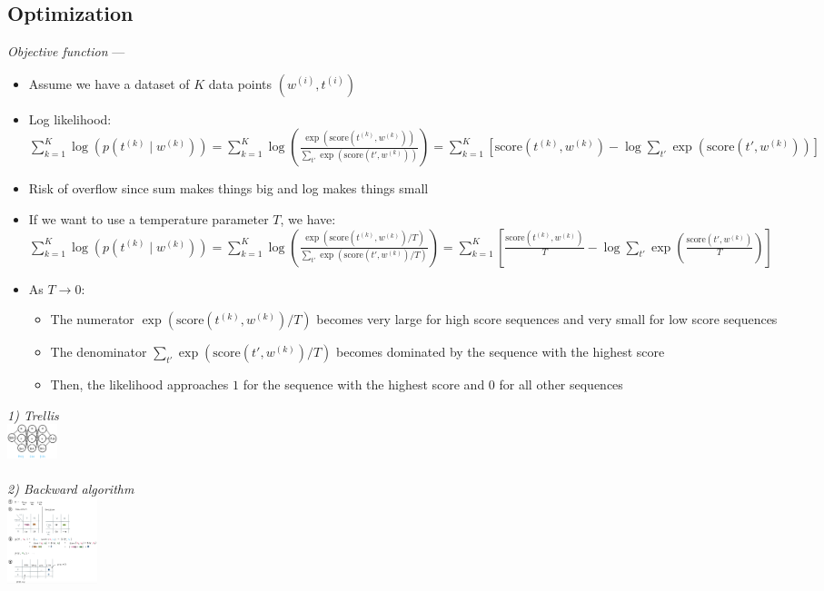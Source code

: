 \subsection*{Optimization}
\emph{Objective function} --- 
\begin{itemize}
    \item Assume we have a dataset of $K$ data points $( w^{(i)}, t^{(i)} )$
    \item Log likelihood:
    $
    \sum_{k=1}^K \log(p(t^{(k)} \mid w^{(k)})) = \sum_{k=1}^K \log ( \frac{\exp(\textrm{score}(t^{(k)}, w^{(k)}))}{\sum_{t'} \exp(\textrm{score}(t', w^{(k)}))} ) = \sum_{k=1}^K [ \textrm{score}(t^{(k)}, w^{(k)}) - \log \sum_{t'} \exp(\textrm{score}(t', w^{(k)})) ]
    $
    \item Risk of overflow since sum makes things big and log makes things small
    \item If we want to use a temperature parameter $T$, we have:
    $
    \sum_{k=1}^K \log(p(t^{(k)} \mid w^{(k)})) = \sum_{k=1}^K \log ( \frac{\exp(\textrm{score}(t^{(k)}, w^{(k)})/ T)}{\sum_{t'} \exp(\textrm{score}(t', w^{(k)})/ T)} ) = \sum_{k=1}^K [ \frac{\textrm{score}(t^{(k)}, w^{(k)})}{T} - \log \sum_{t'} \exp(\frac{\textrm{score}(t', w^{(k)})}{T}) ]
    $
    \item As $T \to 0$:
    \begin{itemize}
        \item The numerator $\exp(\textrm{score}(t^{(k)}, w^{(k)})/ T)$ becomes very large for high score sequences and very small for low score sequences
        \item The denominator $\sum_{t'} \exp(\textrm{score}(t', w^{(k)})/ T)$ becomes dominated by the sequence with the highest score
        \item Then, the likelihood approaches $1$ for the sequence with the highest score and $0$ for all other sequences
    \end{itemize}
\end{itemize}

\begin{multicols}{2}
\textit{1) Trellis}\\
\includegraphics[height=10mm]{inhalt/images/NLP/06_pos_1.png}
\\\\
\textit{2) Backward algorithm}\\
\includegraphics[height=25mm]{inhalt/images/NLP/06_pos_2.png}
\end{multicols}